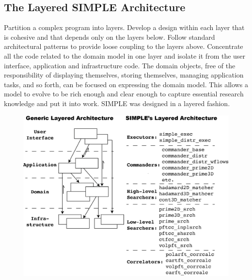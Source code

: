 \documentclass[a4paper,11pt]{article}
\begin{document}
\subsection{The Layered SIMPLE Architecture}
Partition a complex program into layers. Develop a design within each layer that is cohesive and that depends only on the layers below. Follow standard architectural patterns to provide loose coupling to the layers above. Concentrate all the code related to the domain model in one layer and isolate it from the user interface, application and infrastructure code. The domain objects, free of the responsibility of displaying themselves, storing themselves, managing application tasks, and so forth, can be focused on expressing the domain model. This allows a model to evolve to be rich enough and clear enough to capture essential research knowledge and put it into work. SIMPLE was designed in a layered fashion.
\newpage{}
\begin{figure}
\includegraphics[keepaspectratio=true,scale=0.6]{./LayeredArch/layered_arch}
\end{figure}
\end{document}
